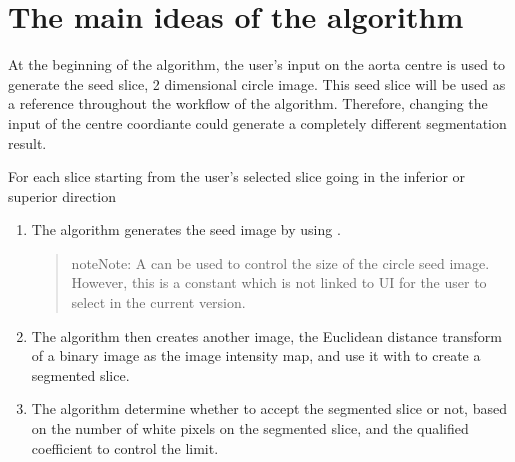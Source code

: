 \documentclass[letterpaper,10pt,english]{sphinxmanual}
\begin{document}
\chapter{The main ideas of the algorithm}
\label{\detokenize{index:the-main-ideas-of-the-algorithm}}
\sphinxAtStartPar
At the beginning of the algorithm, the user’s input on the aorta centre is used to generate the seed slice, 2 dimensional circle image. This seed slice will be used as a reference throughout the workflow of the algorithm. Therefore, changing the input of the centre coordiante could generate a completely different segmentation result.

\sphinxAtStartPar
For each slice starting from the user’s selected slice going in the inferior or superior direction
\begin{enumerate}
%
\item {} 
\sphinxAtStartPar
The algorithm generates the seed image by using .
\begin{quote}

\begin{sphinxadmonition}{note}{Note:}
\sphinxAtStartPar
A {\hyperref[\detokenize{glossary:term-Label-Statistic-coefficient}]{}} can be used to control the size of the circle seed image. However, this is a constant which is not linked to UI for the user to select in the current version.
\end{sphinxadmonition}
\end{quote}

\item {} 
\sphinxAtStartPar
The algorithm then creates another image, the Euclidean distance transform of a binary image as the image intensity map, and use it with  to create a segmented slice.

\item {} 
\sphinxAtStartPar
The algorithm determine whether to accept the segmented slice or not, based on the number of white pixels on the segmented slice, and the qualified coefficient to control the limit.
\begin{quote}


\end{quote}
\end{enumerate}
\end{document}
